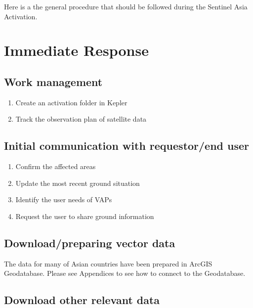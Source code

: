 \documentclass[]{book}
\providecommand{\tightlist}{%
  \setlength{\itemsep}{0pt}\setlength{\parskip}{0pt}}
\theoremstyle{definition}
\theoremstyle{definition}
\theoremstyle{definition}
\theoremstyle{remark}
\begin{document}
Here is a the general procedure that should be followed during the
Sentinel Asia Activation.

\section{Immediate Response}\label{immediate-response}

\subsection{Work management}\label{work-management}

\begin{enumerate}
\def\labelenumi{\arabic{enumi}.}
\tightlist
\item
  Create an activation folder in Kepler
\item
  Track the observation plan of satellite data
\end{enumerate}

\subsection{Initial communication with requestor/end
user}\label{initial-communication-with-requestorend-user}

\begin{enumerate}
\def\labelenumi{\arabic{enumi}.}
\tightlist
\item
  Confirm the affected areas
\item
  Update the most recent ground situation
\item
  Identify the user needs of VAPs
\item
  Request the user to share ground information
\end{enumerate}

\subsection{Download/preparing vector
data}\label{downloadpreparing-vector-data}

The data for many of Asian countries have been prepared in ArcGIS
Geodatabase. Please see Appendices to see how to connect to the
Geodatabase.

\subsection{Download other relevant
data}\label{download-other-relevant-data}
\end{document}
